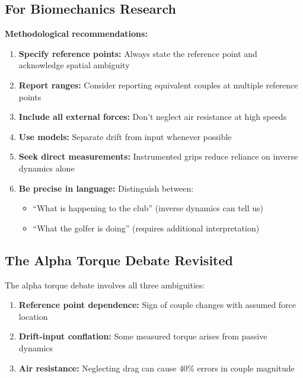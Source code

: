 \documentclass[11pt,a4paper]{article}
\theoremstyle{definition}
\theoremstyle{plain}
\begin{document}
\subsection{For Biomechanics Research}

\textbf{Methodological recommendations:}

\begin{enumerate}
    \item \textbf{Specify reference points:} Always state the reference point and acknowledge spatial ambiguity
    
    \item \textbf{Report ranges:} Consider reporting equivalent couples at multiple reference points
    
    \item \textbf{Include all external forces:} Don't neglect air resistance at high speeds
    
    \item \textbf{Use models:} Separate drift from input whenever possible
    
    \item \textbf{Seek direct measurements:} Instrumented grips reduce reliance on inverse dynamics alone
    
    \item \textbf{Be precise in language:} Distinguish between:
    \begin{itemize}
        \item ``What is happening to the club'' (inverse dynamics can tell us)
        \item ``What the golfer is doing'' (requires additional interpretation)
    \end{itemize}
\end{enumerate}

\subsection{The Alpha Torque Debate Revisited}

The alpha torque debate involves all three ambiguities:

\begin{enumerate}
    \item \textbf{Reference point dependence:} Sign of couple changes with assumed force location
    \item \textbf{Drift-input conflation:} Some measured torque arises from passive dynamics
    \item \textbf{Air resistance:} Neglecting drag can cause 40\% errors in couple magnitude
\end{enumerate}
\end{document}
